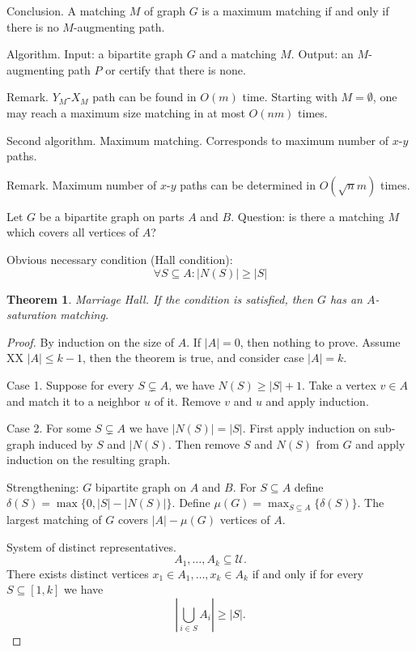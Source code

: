 \documentclass[12pt,a4paper]{article}
\newtheorem{theorem}{Theorem}
\begin{document}
Conclusion.  A matching \(M\) of graph \(G\) is a maximum matching if and only
if there is no \(M\)-augmenting path.

Algorithm.  Input: a bipartite graph \(G\) and a matching \(M\).  Output: an
\(M\)-augmenting path \(P\) or certify that there is none.

Remark.  \(Y_M\)-\(X_M\) path can be found in \(O(m)\) time.  Starting with
\(M=\emptyset\), one may reach a maximum size matching in at most \(O(n m)\)
times.

Second algorithm.  Maximum matching.  Corresponds to maximum number of
\(x\)-\(y\) paths.

Remark.  Maximum number of \(x\)-\(y\) paths can be determined in \(O(\sqrt{n}
m)\) times.

Let \(G\) be a bipartite graph on parts \(A\) and \(B\).  Question: is there a
matching \(M\) which covers all vertices of \(A\)?

Obvious necessary condition (Hall condition):
\[\forall S \subseteq A: |N(S)| \geq |S|\]

\begin{theorem}
  Marriage Hall.  If the condition is satisfied, then \(G\) has an
  \(A\)-saturation matching.
\end{theorem}

\begin{proof}
  By induction on the size of \(A\).  If \(|A| = 0\), then nothing to prove.
  Assume XX \(|A| \leq k -1\), then the theorem is true, and consider case
  \(|A| = k\).

  Case 1. Suppose for every \(S \subsetneq A\), we have \(N(S) \geq |S|+1\).
  Take a vertex \(v \in A\) and match it to a neighbor \(u\) of it.  Remove
  \(v\) and \(u\) and apply induction.

  Case 2. For some \(S \subsetneq A\) we have \(|N(S)| = |S|\).  First apply
  induction on sub-graph induced by \(S\) and \(|N(S)\).  Then remove \(S\) and
  \(N(S)\) from \(G\) and apply induction on the resulting graph.

  Strengthening: \(G\) bipartite graph on \(A\) and \(B\).  For
  \(S \subseteq A\) define \(\delta(S) = \max\{0, |S| - |N(S)|\}\).  Define
  \(\mu(G) = \max_{S \subseteq A}\{\delta(S)\}\).  The largest matching of \(G\)
  covers \(|A| - \mu(G)\) vertices of \(A\).

  System of distinct representatives. \[A_1, \dots, A_k \subseteq \mathcal{U}.\]
  There exists distinct vertices \(x_1 \in A_1, \dots, x_k \in A_k\) if and only
  if for every \(S \subseteq [1, k]\) we have
  \[\left| \bigcup_{i \in S} A_i \right| \geq |S|.\]
\end{proof}
\end{document}
